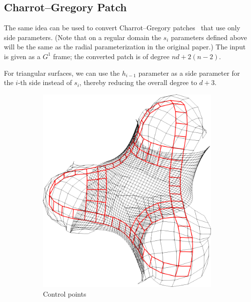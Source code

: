 \documentclass[9pt,academicons]{article}
\begin{document}
\subsection{Charrot--Gregory Patch}
\label{subsec:charrot}
The same idea can be used to convert Charrot--Gregory patches~\cite{Charrot:1984} that use
only side parameters. (Note that on a regular domain the $s_i$ parameters defined above
will be the same as the radial parameterization in the original paper.)
The input is given as a $G^1$ frame; the converted patch is of degree $nd+2(n-2)$.

For triangular surfaces, we can use the $h_{i-1}$ parameter as a side parameter for the $i$-th
side instead of $s_i$, thereby reducing the overall degree to $d+3$.
\begin{figure}[h!]
  \begin{subfigure}{.24\textwidth}
    \centering
    \includegraphics[height=.2\textheight]{images/trebol3-cnet.png}
    \caption{Control points}
    \label{fig:trebol-cnet}
  \end{subfigure}
  \hfill
  \begin{subfigure}{.24\textwidth}
    \centering

\end{subfigure}
\end{figure}
\end{document}
